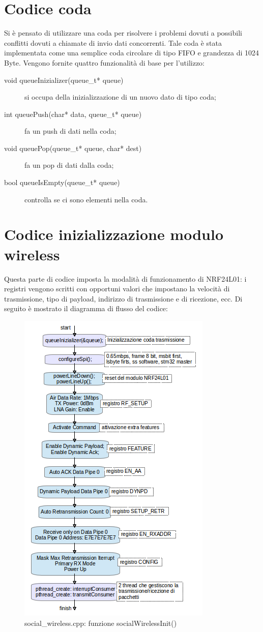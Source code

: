 \section{Codice coda}
Si è pensato di utilizzare una coda per risolvere i problemi dovuti a possibili conflitti dovuti a chiamate di invio dati concorrenti.
Tale coda è stata implementata come una semplice coda circolare di tipo FIFO e grandezza di 1024 Byte.
Vengono fornite quattro funzionalità di base per l’utilizzo:
\begin{description}
	\item [void queueInizializer(queue\_t* queue)] si occupa della inizializzazione di un nuovo dato di tipo coda;
	\item [int queuePush(char* data, queue\_t* queue)] fa un push di dati nella coda;
	\item [void queuePop(queue\_t* queue, char* dest)] fa un pop di dati dalla coda;
	\item [bool queueIsEmpty(queue\_t* queue)] controlla se ci sono elementi nella coda.
\end{description}

\section{Codice inizializzazione modulo wireless}
Questa parte di codice imposta la modalità di funzionamento di NRF24L01: i registri vengono scritti con opportuni valori che impostano
la velocità di trasmissione, tipo di payload, indirizzo di trasmissione e di ricezione, ecc. Di seguito è mostrato il diagramma di flusso del
codice:
\begin{figure}[H]
	\centering
	\includegraphics[width=.6\textwidth]{figure/init-wireless.png}
	\caption{social\_wireless.cpp: funzione socialWirelessInit()}
\end{figure}

